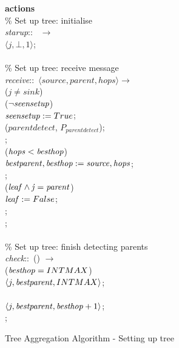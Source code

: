 \begin{figure}[H]
  \centering
  \begin{boxedminipage}{\linewidth}
    \null \textbf{actions}\\
    \null\qq \% Set up tree: initialise\\
    \null\qq \emph{starup}::~ $\rightarrow$\\
    \null\qq\qq {}$\langle j, \bot, 1\rangle$;\\~\\
    \null\qq \% Set up tree: receive message\\
    \null\qq \emph{receive}::~$\langle source, parent, hops\rangle \rightarrow$\\
    \null\qq\qq {} ($j \not= sink$)  \\
    \null\qq\qq\qq {} ($\lnot\mbox{\emph{seensetup}}$)  \\
    \null\qq\qq\qq\qq $\mbox{\emph{seensetup}} \mathrel{:=} True$; \\
    \null\qq\qq\qq\qq {}($\mathit{parentdetect}$, $P_{parentdetect}$); \\
    \null\qq\qq\qq {}; \\
    \null\qq\qq\qq {} ($\mbox{\emph{hops}} < \mbox{\emph{besthop}}$)  \\
    \null\qq\qq\qq\qq $\mbox{\emph{bestparent}}, \mbox{\emph{besthop}} \mathrel{:=} \mbox{\emph{source}}, \mbox{\emph{hops}}$; \\
    \null\qq\qq\qq {}; \\
    \null\qq\qq\qq {} ($\mbox{\emph{leaf}} \land \mbox{\emph{j}} = \mbox{\emph{parent}}$)  \\
    \null\qq\qq\qq\qq $\mbox{\emph{leaf}} \mathrel{:=} False$; \\
    \null\qq\qq\qq {}; \\
    \null\qq\qq {}; \\~\\
    \null\qq \% Set up tree: finish detecting parents\\
    \null\qq \emph{check}::~() $\rightarrow$\\
    \null\qq\qq {} ($\mbox{\emph{besthop}} = INTMAX$)  \\
    \null\qq\qq\qq {}$\langle j, \mbox{\emph{bestparent}}, INTMAX\rangle$;\\
    \null\qq\qq {} \\
    \null\qq\qq\qq {}$\langle j, \mbox{\emph{bestparent}}, \mbox{\emph{besthop}} + 1\rangle$;\\
    \null\qq\qq {};
  \end{boxedminipage}
  \caption{Tree Aggregation Algorithm - Setting up tree}
\end{figure}


